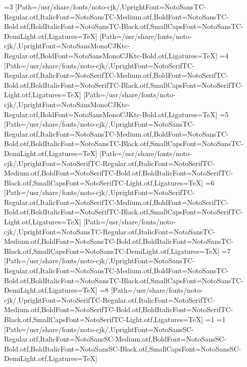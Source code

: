 \else\ifnum\value{CJKFonts}=3
[Path=/usr/share/fonts/noto-cjk/,UprightFont=NotoSansTC-Regular.otf,ItalicFont=NotoSansTC-Medium.otf,BoldFont=NotoSansTC-Bold.otf,BoldItalicFont=NotoSansTC-Black.otf,SmallCapsFont=NotoSansTC-DemiLight.otf,Ligatures=TeX]
[Path=/usr/share/fonts/noto-cjk/,UprightFont=NotoSansMonoCJKtc-Regular.otf,BoldFont=NotoSansMonoCJKtc-Bold.otf,Ligatures=TeX]
\else\ifnum\value{CJKFonts}=4
[Path=/usr/share/fonts/noto-cjk/,UprightFont=NotoSerifTC-Regular.otf,ItalicFont=NotoSerifTC-Medium.otf,BoldFont=NotoSerifTC-Bold.otf,BoldItalicFont=NotoSerifTC-Black.otf,SmallCapsFont=NotoSerifTC-Light.otf,Ligatures=TeX]
[Path=/usr/share/fonts/noto-cjk/,UprightFont=NotoSansMonoCJKtc-Regular.otf,BoldFont=NotoSansMonoCJKtc-Bold.otf,Ligatures=TeX]
\else\ifnum\value{CJKFonts}=5
[Path=/usr/share/fonts/noto-cjk/,UprightFont=NotoSansTC-Regular.otf,ItalicFont=NotoSansTC-Medium.otf,BoldFont=NotoSansTC-Bold.otf,BoldItalicFont=NotoSansTC-Black.otf,SmallCapsFont=NotoSansTC-DemiLight.otf,Ligatures=TeX]
[Path=/usr/share/fonts/noto-cjk/,UprightFont=NotoSerifTC-Regular.otf,ItalicFont=NotoSerifTC-Medium.otf,BoldFont=NotoSerifTC-Bold.otf,BoldItalicFont=NotoSerifTC-Black.otf,SmallCapsFont=NotoSerifTC-Light.otf,Ligatures=TeX]
\else\ifnum\value{CJKFonts}=6
[Path=/usr/share/fonts/noto-cjk/,UprightFont=NotoSerifTC-Regular.otf,ItalicFont=NotoSerifTC-Medium.otf,BoldFont=NotoSerifTC-Bold.otf,BoldItalicFont=NotoSerifTC-Black.otf,SmallCapsFont=NotoSerifTC-Light.otf,Ligatures=TeX]
[Path=/usr/share/fonts/noto-cjk/,UprightFont=NotoSansTC-Regular.otf,ItalicFont=NotoSansTC-Medium.otf,BoldFont=NotoSansTC-Bold.otf,BoldItalicFont=NotoSansTC-Black.otf,SmallCapsFont=NotoSansTC-DemiLight.otf,Ligatures=TeX]
\else\ifnum\value{CJKFonts}=7
[Path=/usr/share/fonts/noto-cjk/,UprightFont=NotoSansTC-Regular.otf,ItalicFont=NotoSansTC-Medium.otf,BoldFont=NotoSansTC-Bold.otf,BoldItalicFont=NotoSansTC-Black.otf,SmallCapsFont=NotoSansTC-DemiLight.otf,Ligatures=TeX]
\else\ifnum\value{CJKFonts}=8
[Path=/usr/share/fonts/noto-cjk/,UprightFont=NotoSerifTC-Regular.otf,ItalicFont=NotoSerifTC-Medium.otf,BoldFont=NotoSerifTC-Bold.otf,BoldItalicFont=NotoSerifTC-Black.otf,SmallCapsFont=NotoSerifTC-Light.otf,Ligatures=TeX]
\fi\fi\fi\fi\fi\fi\fi\fi\else
\ifnum\value{CJKLanguage}=1
\ifnum\value{CJKFonts}=1
[Path=/usr/share/fonts/noto-cjk/,UprightFont=NotoSansSC-Regular.otf,ItalicFont=NotoSansSC-Medium.otf,BoldFont=NotoSansSC-Bold.otf,BoldItalicFont=NotoSansSC-Black.otf,SmallCapsFont=NotoSansSC-DemiLight.otf,Ligatures=TeX]
